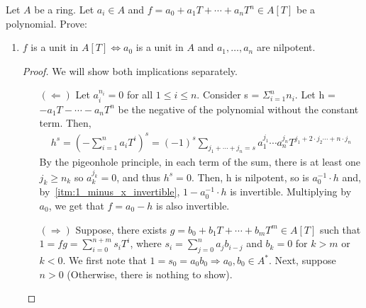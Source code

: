 \begin{problem}
\begin{enumerate}[label=(\theproblem.\arabic*),ref=\theproblem.\arabic*]
\begin{sol}
            \end{sol}
    \end{enumerate}

\end{problem}

\begin{problem}
    Let $A$ be a ring.
    Let $a_i\in A$ and $f = a_0 + a_1 T + \cdots + a_n T^n \in A[T]$ be a polynomial.
    Prove:
    \begin{enumerate}[label=(\theproblem.\arabic*),ref=\theproblem.\arabic*]
        \item \label{itm:coefficients_nilpotent}
        $f$ is a unit in $A[T] \iff a_0$ is a unit in $A$ and $a_1, \ldots, a_n$ are nilpotent.
            \begin{sol}
                \begin{proof}
                    We will show both implications separately.
                    \begin{itemize}
                        \item[$(\Leftarrow)$]
                        Let $a_i^{n_i} = 0$ for all $1 \leq i \leq n$.
                        Consider s = $\varSigma_{i=1}^{n} n_i$.
                        Let h = $-a_1 T - \cdots - a_n T^n$ be the negative of the polynomial without the constant term.
                        Then,
                            \begin{align*}
                                h^s = \left(- \sum_{i=1}^{n} a_i T^i \right)^s = (-1)^s \sum_{j_1 + \cdots + j_n = s} a_1^{j_1} \cdots a_n^{j_n} T^{j_1 + 2 \cdot j_2 \cdots + n \cdot j_n}
                            \end{align*}
                        By the pigeonhole principle, in each term of the sum, there is at least one $j_k \geq n_k$ so $a_k^{j_k} = 0$, and thus $h^s = 0$.
                        Then, h is nilpotent, so is $a_0^{-1} \cdot h$ and, by~\ref{itm:1_minus_x_invertible}, $1 - a_0^{-1} \cdot h$ is invertible.
                        Multiplying by $a_0$, we get that $f = a_0 - h$ is also invertible.
                        \item[$(\Rightarrow)$]
                        Suppose, there exists $g = b_0 + b_1 T + \cdots + b_m T^m \in A[T]$ such that $1 = fg = \sum_{i=0}^{n+m} s_i T^i$,
                        where $s_i =  \sum_{j=0}^{n} a_j b_{i-j}$ and $b_k = 0$ for $k>m$ or $k < 0$.
                        We first note that $1 = s_0 = a_0 b_0 \Rightarrow a_0, b_0 \in A^*$.
                        Next, suppose $n > 0$ (Otherwise, there is nothing to show).

\end{itemize}
\end{proof}
\end{sol}
\end{enumerate}
\end{problem}
